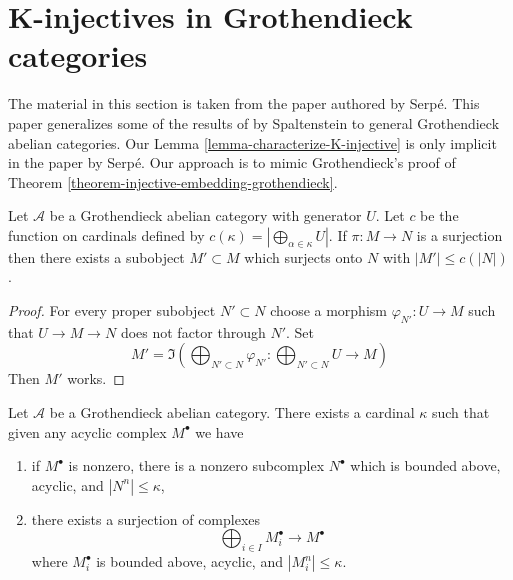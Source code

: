 \section{K-injectives in Grothendieck categories}
\label{section-K-injective}

\noindent
The material in this section is taken from the paper \cite{serpe}
authored by Serp\'e. This paper generalizes some of the results
of \cite{Spaltenstein} by Spaltenstein to general Grothendieck abelian
categories. Our Lemma \ref{lemma-characterize-K-injective}
is only implicit in the paper by Serp\'e. Our approach is to mimic
Grothendieck's proof of
Theorem \ref{theorem-injective-embedding-grothendieck}.

\begin{lemma}
\label{lemma-surjection-bounded-size}
Let $\mathcal{A}$ be a Grothendieck abelian category with generator $U$.
Let $c$ be the function on cardinals defined by
$c(\kappa) = |\bigoplus_{\alpha \in \kappa} U|$. If $\pi : M \to N$ is a
surjection then there exists a subobject $M' \subset M$ which surjects
onto $N$ with $|M'| \leq c(|N|)$.
\end{lemma}

\begin{proof}
For every proper subobject $N' \subset N$ choose a morphism
$\varphi_{N'} : U \to M$ such that $U \to M \to N$ does not factor
through $N'$. Set
$$
M' = \Im\left(
\bigoplus\nolimits_{N' \subset N} \varphi_{N'} :
\bigoplus\nolimits_{N' \subset N} U \longrightarrow M\right)
$$
Then $M'$ works.
\end{proof}

\begin{lemma}
\label{lemma-acyclic-quotient-complexes-bounded-size}
Let $\mathcal{A}$ be a Grothendieck abelian category. There exists a cardinal
$\kappa$ such that given any acyclic complex $M^\bullet$ we have
\begin{enumerate}
\item if $M^\bullet$ is nonzero, there is a nonzero subcomplex
$N^\bullet$ which is bounded above, acyclic, and $|N^n| \leq \kappa$,
\item there exists a surjection of complexes
$$
\bigoplus\nolimits_{i \in I} M_i^\bullet \longrightarrow M^\bullet
$$
where $M_i^\bullet$ is bounded above, acyclic, and $|M_i^n| \leq \kappa$.
\end{enumerate}
\end{lemma}

